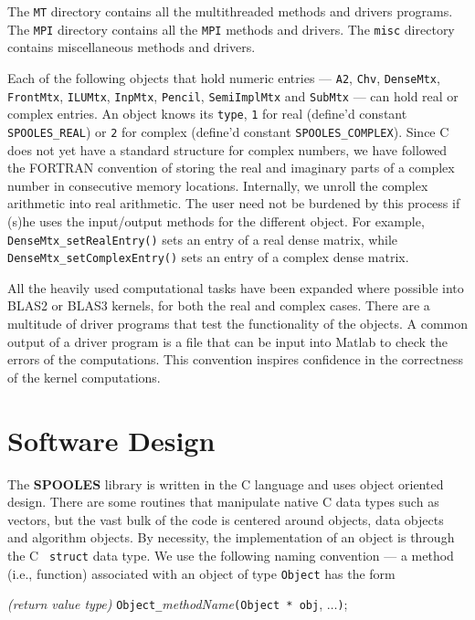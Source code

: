 The {\tt MT} directory contains all the multithreaded methods 
and drivers programs.
The {\tt MPI} directory contains all the {\tt MPI} methods and drivers.
The {\tt misc} directory contains miscellaneous methods and drivers.
\par
Each of the following objects that hold numeric entries ---
{\tt A2}, {\tt Chv}, {\tt DenseMtx}, {\tt FrontMtx}, 
{\tt ILUMtx},
{\tt InpMtx},
{\tt Pencil},
{\tt SemiImplMtx} and 
{\tt SubMtx} --- can hold real or complex entries.
An object knows its {\tt type},
{\tt 1} for real (define'd constant {\tt SPOOLES\_REAL})
or
{\tt 2} for complex (define'd constant {\tt SPOOLES\_COMPLEX}).
Since C does not yet have a standard structure for complex numbers,
we have followed the FORTRAN convention of storing the real and
imaginary parts of a complex number in consecutive memory locations.
Internally, we unroll the complex arithmetic into real arithmetic.
The user need not be burdened by this process if (s)he uses the
input/output methods for the different object.
For example, 
{\tt DenseMtx\_setRealEntry()} sets an entry of a real dense matrix, 
while {\tt DenseMtx\_setComplexEntry()} sets an entry of a complex
dense matrix. 
\par
All the heavily used computational tasks have been expanded where
possible into BLAS2 or BLAS3 kernels, for both the real and complex
cases.
There are a multitude of driver programs that test the
functionality of the objects.
A common output of a driver program is a file that can be input
into Matlab to check the errors of the computations.
This convention inspires confidence in the correctness of the
kernel computations.
\par
\section{Software Design}
\label{chapter:softwareDesign}
\par
The {\bf SPOOLES} library is written in the C language and uses
object oriented design.
There are some routines that manipulate native C data types such as
vectors, but the vast bulk of the code is centered around objects,
data objects and algorithm objects.
By necessity, the implementation of an object is through the C {\tt
struct} data type.
We use the following naming convention --- a method (i.e., function)
associated with an object of type {\tt Object} has the form

\centerline{{\it (return value type)}
{\tt Object\_}{\it methodName}{\tt (Object * obj}, $\ldots${\tt )};}

